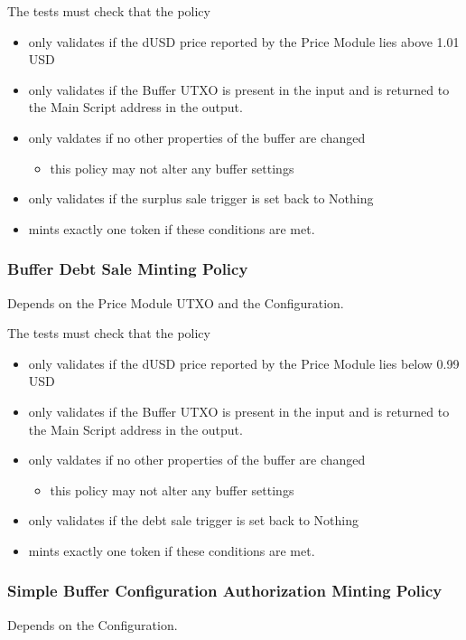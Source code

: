 \documentclass{article} %
\begin{document}
The tests must check that the policy
\begin{itemize}
  \item only validates if the dUSD price reported by the Price Module lies above 1.01 USD
  \item only validates if the Buffer UTXO is present in the input and is returned to the Main Script address in the output.
  \item only valdates if no other properties of the buffer are changed
  \begin{itemize}
    \item this policy may not alter any buffer settings
  \end{itemize}
  \item only validates if the surplus sale trigger is set back to Nothing
  \item mints exactly one token if these conditions are met.
\end{itemize}

\subsubsection{Buffer Debt Sale Minting Policy}
Depends on the Price Module UTXO and the Configuration.

The tests must check that the policy
\begin{itemize}
  \item only validates if the dUSD price reported by the Price Module lies below 0.99 USD
  \item only validates if the Buffer UTXO is present in the input and is returned to the Main Script address in the output.
  \item only valdates if no other properties of the buffer are changed
  \begin{itemize}
    \item this policy may not alter any buffer settings
  \end{itemize}
  \item only validates if the debt sale trigger is set back to Nothing
  \item mints exactly one token if these conditions are met.
\end{itemize}

\subsubsection{Simple Buffer Configuration Authorization Minting Policy}
Depends on the Configuration.
\end{document}
